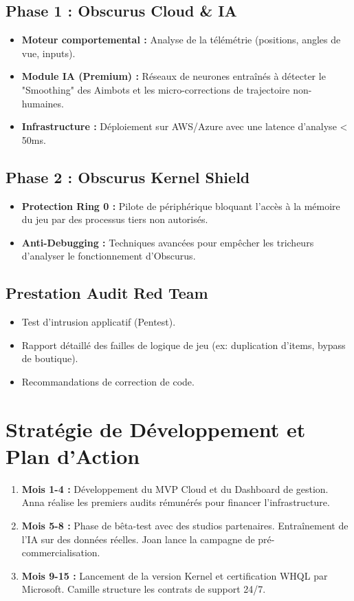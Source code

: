 \documentclass[12pt,a4paper]{article}
\begin{document}
\subsection{Phase 1 : Obscurus Cloud \& IA}
\begin{itemize}
    \item \textbf{Moteur comportemental :} Analyse de la télémétrie (positions, angles de vue, inputs).
    \item \textbf{Module IA (Premium) :} Réseaux de neurones entraînés à détecter le "Smoothing" des Aimbots et les micro-corrections de trajectoire non-humaines.
    \item \textbf{Infrastructure :} Déploiement sur AWS/Azure avec une latence d'analyse < 50ms.
\end{itemize}

\subsection{Phase 2 : Obscurus Kernel Shield}
\begin{itemize}
    \item \textbf{Protection Ring 0 :} Pilote de périphérique bloquant l'accès à la mémoire du jeu par des processus tiers non autorisés.
    \item \textbf{Anti-Debugging :} Techniques avancées pour empêcher les tricheurs d'analyser le fonctionnement d'Obscurus.
\end{itemize}

\subsection{Prestation Audit Red Team}
\begin{itemize}
    \item Test d'intrusion applicatif (Pentest).
    \item Rapport détaillé des failles de logique de jeu (ex: duplication d'items, bypass de boutique).
    \item Recommandations de correction de code.
\end{itemize}

\section{Stratégie de Développement et Plan d'Action}
\begin{enumerate}
    \item \textbf{Mois 1-4 :} Développement du MVP Cloud et du Dashboard de gestion. Anna réalise les premiers audits rémunérés pour financer l'infrastructure.
    \item \textbf{Mois 5-8 :} Phase de bêta-test avec des studios partenaires. Entraînement de l'IA sur des données réelles. Joan lance la campagne de pré-commercialisation.
    \item \textbf{Mois 9-15 :} Lancement de la version Kernel et certification WHQL par Microsoft. Camille structure les contrats de support 24/7.
\end{enumerate}
\end{document}
